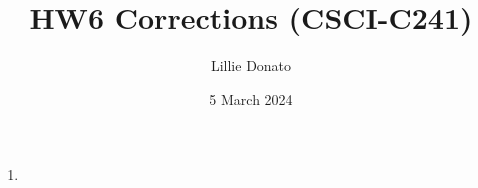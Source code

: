 \documentclass{article}
\title{HW6 Corrections (CSCI-C241)}
\author{Lillie Donato}
\date{5 March 2024}
\begin{document}
\maketitle

\begin{enumerate}
    \item 
\end{enumerate}
\end{document}
